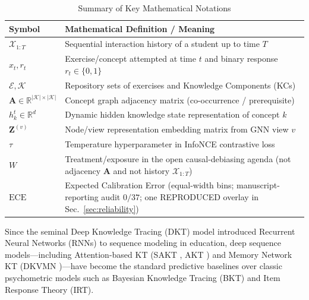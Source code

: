 \documentclass[lettersize,journal]{IEEEtran}
\begin{document}
\begin{table}[t]
\caption{Summary of Key Mathematical Notations}
\label{tab:notation_summary}
\centering
\footnotesize
\begin{tabular}{@{}lp{}@{}}
\toprule
\textbf{Symbol} & \textbf{Mathematical Definition / Meaning} \\
\midrule
$\mathcal{X}_{1:T}$ & Sequential interaction history of a student up to time $T$ \\
$x_t, r_t$ & Exercise/concept attempted at time $t$ and binary response $r_t \in \{0,1\}$ \\
$\mathcal{E}, \mathcal{K}$ & Repository sets of exercises and Knowledge Components (KCs) \\
$\mathbf{A} \in \mathbb{R}^{|\mathcal{K}| \times |\mathcal{K}|}$ & Concept graph adjacency matrix (co-occurrence / prerequisite) \\
$h_k^t \in \mathbb{R}^d$ & Dynamic hidden knowledge state representation of concept $k$ \\
$\mathbf{Z}^{(v)}$ & Node/view representation embedding matrix from GNN view $v$ \\
$\tau$ & Temperature hyperparameter in InfoNCE contrastive loss \\
$W$ & Treatment/exposure in the open causal-debiasing agenda (not adjacency $\mathbf{A}$ and not history $\mathcal{X}_{1:T}$) \\
$\text{ECE}$ & Expected Calibration Error (equal-width bins; manuscript-reporting audit $0/37$; one REPRODUCED overlay in Sec.~\ref{sec:reliability}) \\
\bottomrule
\end{tabular}
\end{table}

Since the seminal Deep Knowledge Tracing (DKT) model \cite{Piech_DKT_2015} introduced Recurrent Neural Networks (RNNs) to sequence modeling in education, deep sequence models---including Attention-based KT (SAKT \cite{Pandey_SAKT_2019}, AKT \cite{Ghosh_AKT_2020}) and Memory Network KT (DKVMN \cite{Zhang_DKVMN_2017})---have become the standard predictive baselines over classic psychometric models such as Bayesian Knowledge Tracing (BKT) and Item Response Theory (IRT).
\end{document}
